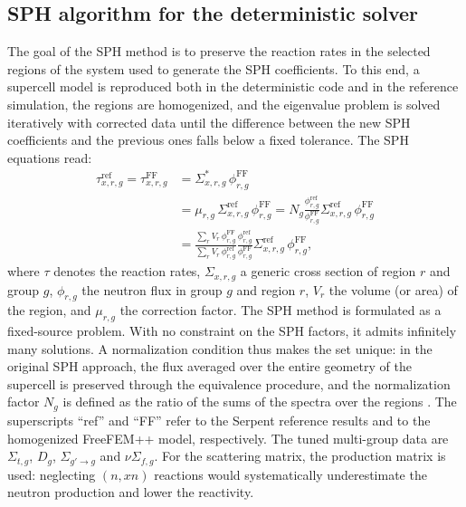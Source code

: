 \subsection{SPH algorithm for the deterministic solver}
The goal of the SPH method is to preserve the reaction rates in the selected regions of the system used to generate the SPH coefficients. To this end, a supercell model is reproduced both in the deterministic code and in the reference simulation, the regions are homogenized, and the eigenvalue problem is solved iteratively with corrected data until the difference between the new SPH coefficients and the previous ones falls below a fixed tolerance. The SPH equations read:
\begin{equation}
\begin{split}
\tau_{x,r,g}^{\text{ref}} = \tau_{x,r,g}^{\text{FF}} &= \Sigma_{x,r,g}^{*} \, \phi_{r,g}^{\text{FF}} \\
&= \mu_{r,g} \, \Sigma_{x,r,g}^{\text{ref}} \, \phi_{r,g}^{\text{FF}} = N_{g} \frac{\phi_{r,g}^{\text{ref}}}{\phi_{r,g}^{\text{FF}}}  \Sigma_{x,r,g}^{\text{ref}} \, \phi_{r,g}^{\text{FF}} \\
&= \frac{\displaystyle\sum_r V_r \, \phi_{r,g}^{\text{FF}}}{\displaystyle\sum_r V_r \, \phi_{r,g}^{\text{ref}}} \frac{\phi_{r,g}^{\text{ref}}}{\phi_{r,g}^{\text{FF}}}  \Sigma_{x,r,g}^{\text{ref}} \, \phi_{r,g}^{\text{FF}},
\end{split}
\label{sph:eq:SPH_equations}
\end{equation}
where $\tau$ denotes the reaction rates, $\Sigma_{x,r,g}$ a generic cross section of region $r$ and group $g$, $\phi_{r,g}$ the neutron flux in group $g$ and region $r$, $V_r$ the volume (or area) of the region, and $\mu_{r,g}$ the correction factor. The SPH method is formulated as a fixed-source problem. With no constraint on the SPH factors, it admits infinitely many solutions. A normalization condition thus makes the set unique: in the original SPH approach, the flux averaged over the entire geometry of the supercell is preserved through the equivalence procedure, and the normalization factor $N_g$ is defined as the ratio of the sums of the spectra over the regions \cite{Ortensi_normalization_factor}. The superscripts ``ref'' and ``FF'' refer to the Serpent reference results and to the homogenized FreeFEM++ model, respectively. The tuned multi-group data are $\Sigma_{t,g}$, $D_{g}$, $\Sigma_{g' \to g}$ and $\nu\Sigma_{f,g}$. For the scattering matrix, the production matrix is used: neglecting $(n,xn)$ reactions would systematically underestimate the neutron production and lower the reactivity.
